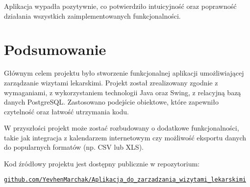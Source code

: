 Aplikacja wypadła pozytywnie, co potwierdziło intuicyjność oraz poprawność działania wszystkich zaimplementowanych funkcjonalności.

\section{Podsumowanie}

Głównym celem projektu było stworzenie funkcjonalnej aplikacji umożliwiającej zarządzanie wizytami lekarskimi. Projekt został zrealizowany zgodnie z wymaganiami, z wykorzystaniem technologii Java oraz Swing, z relacyjną bazą danych PostgreSQL. Zastosowano podejście obiektowe, które zapewniło czytelność oraz łatwość utrzymania kodu.

W przyszłości projekt może zostać rozbudowany o dodatkowe funkcjonalności, takie jak integracja z kalendarzem internetowym czy możliwość eksportu danych do popularnych formatów (np. CSV lub XLS).

Kod źródłowy projektu jest dostępny publicznie w repozytorium:
\begin{center}
\href{https://github.com/YevhenMarchak/Aplikacja_do_zarzadzania_wizytami_lekarskimi.git}{\texttt{github.com/YevhenMarchak/Aplikacja\_do\_zarzadzania\_wizytami\_lekarskimi}}
\end{center}